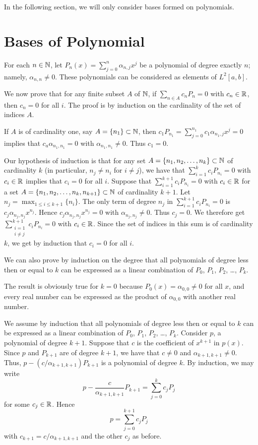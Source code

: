 In the following section, we will only consider bases formed on
polynomials.

\section{Bases of Polynomial} 

For each $n \in \mathbb{N}$, let
$\displaystyle P_n(x) = \sum_{j=0}^n \alpha_{n,j}x^j$ be a
polynomial of degree exactly $n$; namely, $\alpha_{n,n} \neq 0$.
These polynomials can be considered as elements of $L^2[a,b]$.

We now prove that for any finite subset $A$ of $\mathbb{N}$, if
$\displaystyle \sum_{n\in A} c_n P_n = 0$ with $c_n \in \mathbb{R}$,
then $c_n =0$ for all $i$.  The proof is by induction on the
cardinality of the set of indices $A$.

If $A$ is of cardinality one, say $A = \{ n_1\} \subset \mathbb{N}$,
then $\displaystyle c_1 P_{n_1} = \sum_{j=0}^{n_1} c_1 \alpha_{n_1,j}x^j = 0$
implies that $c_a \alpha_{n_1,n_1} = 0$ with $\alpha_{n_1,n_1} \neq 0$.
Thus $c_1 = 0$.

Our hypothesis of induction is that for any set
$A = \{ n_1, n_2, \ldots , n_k \} \subset \mathbb{N}$ of
cardinality $k$ (in particular, $n_j \neq n_i$ for $i\neq j$), we have that
$\displaystyle \sum_{i=1}^k c_i P_{n_i} = 0$ with $c_i \in \mathbb{R}$
implies that $c_i = 0$ for all $i$.  Suppose that
$\displaystyle \sum_{i=1}^{k+1} c_i P_{n_i} = 0$ with $c_i \in \mathbb{R}$ for
a set $A = \{ n_1, n_2, \ldots , n_k,n_{k+1} \} \subset \mathbb{N}$ of
cardinality $k+1$.  Let $\displaystyle n_j = \max_{1\leq i \leq k+1}\{ n_i\}$.
The only term of degree $n_j$ in
$\displaystyle \sum_{i=1}^{k+1} c_i P_{n_i} = 0$
is $c_j \alpha_{n_j,n_j} x^{n_j}$.  Hence $c_j \alpha_{n_j,n_j}x^{n_j} = 0$
with $\alpha_{n_j,n_j} \neq 0$.  Thus $c_j=0$.  We
therefore get
$\displaystyle
\sum_{\substack{i=1\\i\neq j}}^{k+1} c_i P_{n_i} = 0$ with
$c_i \in \mathbb{R}$.
Since the set of indices in this sum is of cardinality $k$, we get by
induction that $c_i = 0$ for all $i$.

We can also prove by induction on the degree that all polynomials of
degree less then or equal to $k$ can be expressed as a linear
combination of $P_0$, $P_1$, $P_2$, \ldots, $P_k$.

The result is obviously true for $k=0$ because $P_0(x)= \alpha_{0,0}\neq 0$
for all $x$, and every real number can be expressed as the
product of $\alpha_{0,0}$ with another real number.

We assume by induction that all polynomials of degree less then or
equal to $k$ can be expressed as a linear combination of $P_0$, $P_1$,
$P_2$, \ldots, $P_k$.  Consider $p$, a 
polynomial of degree $k+1$.  Suppose that $c$ is the coefficient of
$x^{k+1}$ in $p(x)$.  Since $p$ and $P_{k+1}$ are of degree $k+1$, we have
that $c\neq 0$ and $\alpha_{k+1,k+1} \neq 0$.  Thus,
$\displaystyle p - (c/\alpha_{k+1,k+1}) P_{k+1}$ is a polynomial of
degree $k$.  By induction, we may write
\[
p - \frac{c}{\alpha_{k+1,k+1}} P_{k+1} = \sum_{j=0}^k c_j P_j
\]
for some $c_j \in \mathbb{R}$.  Hence
\[
p = \sum_{j=0}^{k+1} c_j P_j
\]
with $c_{k+1} = c/\alpha_{k+1,k+1}$ and the other $c_j$ as before.


